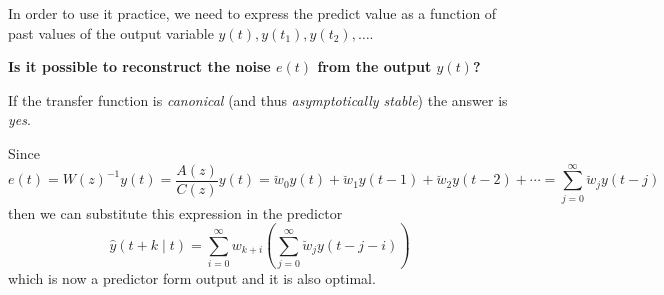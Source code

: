 In order to use it practice, we need to express the predict value as a function of past values of the output variable $y(t), y(t_1), y(t_2),\ldots$.

\textbf{Is it possible to reconstruct the noise $e(t)$ from the output $y(t)$?}

If the transfer function is \emph{canonical} (and thus \emph{asymptotically stable}) the answer is \emph{yes}.

Since
\begin{equation}\label{eq:reconstruction-noise-from-data}
	e(t)=W(z)^{-1} y(t)=\frac{A(z)}{C(z)} y(t)=\breve{w}_{0} y(t)+\breve{w}_{1} y(t-1)+\breve{w}_{2} y(t-2)+\cdots = \sum_{j=0}^{\infty} \breve{w}_{j}y(t-j)
\end{equation}
then we can substitute this expression in the predictor
\[
	\boxed{\hat{y}(t+k \mid t)=\sum_{i=0}^{\infty} w_{k+i}\left(\sum_{j=0}^{\infty} \breve{w}_{j}y(t-j-i)\right)}
\]
which is now a predictor form output and it is also optimal.

